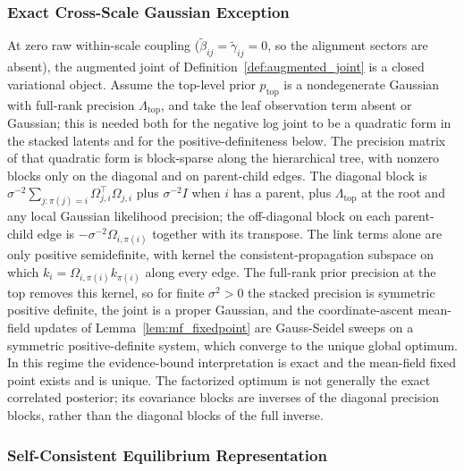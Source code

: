 \subsubsection{Exact Cross-Scale Gaussian Exception}
\label{app:cross_scale_gaussian_exception}

At zero raw within-scale coupling ($\tilde\beta_{ij}=\tilde\gamma_{ij}=0$, so the alignment sectors are absent), the augmented joint of Definition~\ref{def:augmented_joint} is a closed variational object. Assume the top-level prior $p_{\mathrm{top}}$ is a nondegenerate Gaussian with full-rank precision $\Lambda_{\mathrm{top}}$, and take the leaf observation term absent or Gaussian; this is needed both for the negative log joint to be a quadratic form in the stacked latents and for the positive-definiteness below. The precision matrix of that quadratic form is block-sparse along the hierarchical tree, with nonzero blocks only on the diagonal and on parent-child edges. The diagonal block is $\sigma^{-2}\sum_{j:\pi(j)=i}\Omega_{j,i}^\top\Omega_{j,i}$ plus $\sigma^{-2}I$ when $i$ has a parent, plus $\Lambda_{\mathrm{top}}$ at the root and any local Gaussian likelihood precision; the off-diagonal block on each parent-child edge is $-\sigma^{-2}\Omega_{i,\pi(i)}$ together with its transpose. The link terms alone are only positive semidefinite, with kernel the consistent-propagation subspace on which $k_i = \Omega_{i,\pi(i)}k_{\pi(i)}$ along every edge. The full-rank prior precision at the top removes this kernel, so for finite $\sigma^2 > 0$ the stacked precision is symmetric positive definite, the joint is a proper Gaussian, and the coordinate-ascent mean-field updates of Lemma~\ref{lem:mf_fixedpoint} are Gauss-Seidel sweeps on a symmetric positive-definite system, which converge to the unique global optimum. In this regime the evidence-bound interpretation is exact and the mean-field fixed point exists and is unique. The factorized optimum is not generally the exact correlated posterior; its covariance blocks are inverses of the diagonal precision blocks, rather than the diagonal blocks of the full inverse.

\subsubsection{Self-Consistent Equilibrium Representation}

